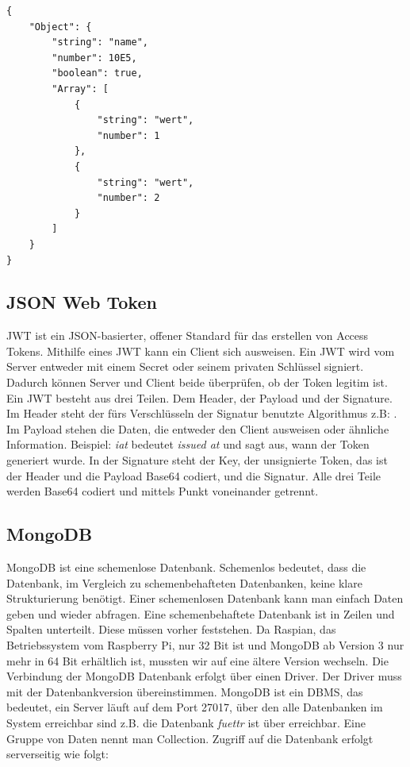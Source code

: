 \begin{lstlisting}[style=JSON,caption=\ac{JSON} Beispiel]
{
	"Object": {	
		"string": "name",
		"number": 10E5,
		"boolean": true,
		"Array": [
			{
				"string": "wert",
				"number": 1
			},
			{
				"string": "wert",
				"number": 2
			}
		]
	}
}
\end{lstlisting}

\subsection{JSON Web Token}
\label{sec:vor-jwt}
\ac{JWT} ist ein JSON-basierter, offener Standard für das erstellen von Access Tokens. Mithilfe eines \ac{JWT} kann ein Client sich ausweisen. Ein \ac{JWT} wird vom Server entweder mit einem Secret oder seinem privaten Schlüssel signiert. Dadurch können Server und Client beide überprüfen, ob der Token legitim ist. Ein \ac{JWT} besteht aus drei Teilen. Dem Header, der Payload und der Signature. Im Header steht der fürs Verschlüsseln der Signatur benutzte Algorithmus z.B: . Im Payload stehen die Daten, die entweder den Client ausweisen oder ähnliche Information. Beispiel:  \textit{iat} bedeutet \textit{issued at} und sagt aus, wann der Token generiert wurde. In der Signature steht der Key, der unsignierte Token, das ist der Header und die Payload Base64 codiert, und die Signatur. Alle drei Teile werden Base64 codiert und mittels Punkt voneinander getrennt.

\subsection{MongoDB}
\label{sec:vor-mongo}
MongoDB ist eine schemenlose Datenbank. Schemenlos bedeutet, dass die Datenbank, im Vergleich zu schemenbehafteten Datenbanken, keine klare Strukturierung benötigt. Einer schemenlosen Datenbank kann man einfach Daten geben und wieder abfragen. Eine schemenbehaftete Datenbank ist in Zeilen und Spalten unterteilt. Diese müssen vorher feststehen. Da Raspian, das Betriebssystem vom Raspberry Pi, nur 32 Bit ist und MongoDB ab Version 3 nur mehr in 64 Bit erhältlich ist, mussten wir auf eine ältere Version wechseln. Die Verbindung der MongoDB Datenbank erfolgt über einen Driver. Der Driver muss mit der Datenbankversion übereinstimmen. MongoDB ist ein \ac{DBMS}, das bedeutet, ein Server läuft auf dem Port 27017, über den alle Datenbanken im System erreichbar sind z.B. die Datenbank \textit{fuettr} ist über  erreichbar. Eine Gruppe von Daten nennt man Collection. Zugriff auf die Datenbank erfolgt serverseitig wie folgt:

